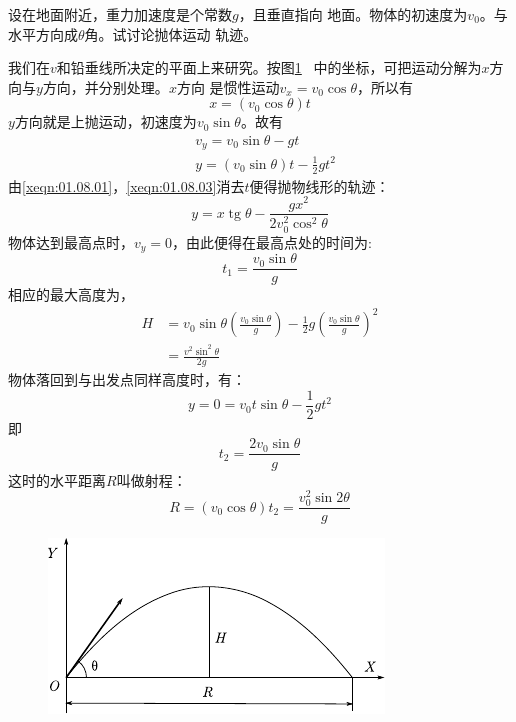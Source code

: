\example 设在地面附近，重力加速度是个常数$g$，且垂直指向
地面。物体的初速度为$ v_0 $。与水平方向成$ \theta $角。试讨论抛体运动
轨迹。

\discussion 我们在$ v $和铅垂线所决定的平面上来研究。按图\ref{fig:01.16}~
中的坐标，可把运动分解为$ x $方向与$ y $方向，并分别处理。$ x $方向
是惯性运动$ v_x=v_0\cos\theta $，所以有
\begin{equation*}\label{xeqn:01.08.01}
    x=(v_0\cos\theta)t \tag{1}
\end{equation*}
$ y $方向就是上抛运动，初速度为$ v_0\sin\theta$。故有
\begin{align*}
\label{xeqn:01.08.02} &v_y=v_0\sin\theta-gt \tag{2} \\
\label{xeqn:01.08.03} &y=(v_0\sin\theta)t-\frac{1}{2}gt^2 \tag{3}
\end{align*}
由\eqref{xeqn:01.08.01}，\eqref{xeqn:01.08.03}消去$ t $便得抛物线形的轨迹：
\begin{equation*}\label{xeqn:01.08.04}
    y=x \operatorname{tg} \theta-\frac{g x^{2}}{2 v_{0}^{2} \cos ^{2} \theta} \tag{4}
\end{equation*}
物体达到最高点时，$ v_y=0 $，由此便得在最高点处的时间为:
\begin{equation*}
    t_{1}=\frac{v_{0} \sin \theta}{g}
\end{equation*}
相应的最大高度为，
\begin{equation*}
    \begin{aligned}
        H &=v_{0} \sin \theta\left(\frac{v_{0} \sin \theta}{g}\right)-\frac{1}{2} g\left(\frac{v_{0} \sin \theta}{g}\right)^{2} \\
        &=\frac{v^{2} \sin ^{2} \theta}{2 g}
    \end{aligned}
\end{equation*}
物体落回到与出发点同样高度时，有：
\begin{equation*}
    y=0=v_{0} t \sin \theta-\frac{1}{2} g t^{2}
\end{equation*}
\clearpage
\noindent 即\vspace{-0.8em}
\begin{equation*}
    t_{2}=\frac{2 v_{0} \sin \theta}{g}
\end{equation*}
这时的水平距离$R$叫做射程：
\begin{equation*}
    R=\left(v_{0} \cos \theta\right) t_{2}=\frac{v_{0}^{2} \sin 2 \theta}{g}
\end{equation*}
\begin{figure}
    \centering
    \includegraphics{figure/fig01.16}
    \caption{}
    \label{fig:01.16}
\end{figure}
